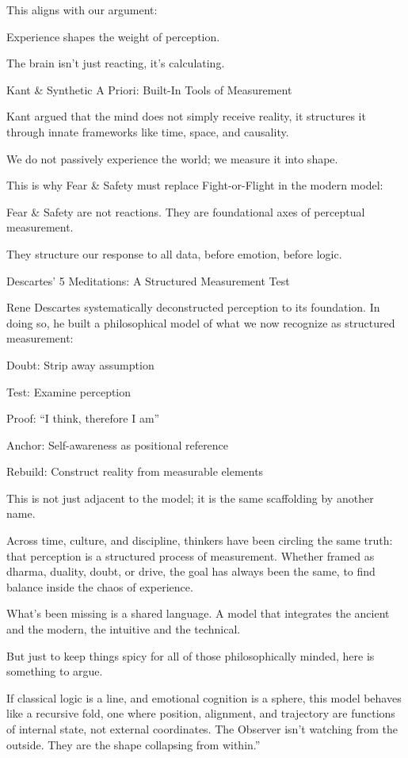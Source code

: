 \documentclass[11pt]{article}
\begin{document}
This aligns with our argument:

Experience shapes the weight of perception.

The brain isn’t just reacting, it’s calculating.

Kant & Synthetic A Priori: Built-In Tools of Measurement

Kant argued that the mind does not simply receive reality, it structures it through innate frameworks like time, space, and causality.

We do not passively experience the world; we measure it into shape.

This is why Fear & Safety must replace Fight-or-Flight in the modern model:

Fear & Safety are not reactions. They are foundational axes of perceptual measurement.

They structure our response to all data, before emotion, before logic.

Descartes’ 5 Meditations: A Structured Measurement Test

Rene Descartes systematically deconstructed perception to its foundation. In doing so, he built a philosophical model of what we now recognize as structured measurement:

Doubt: Strip away assumption

Test: Examine perception

Proof: “I think, therefore I am”

Anchor: Self-awareness as positional reference

Rebuild: Construct reality from measurable elements

This is not just adjacent to the model; it is the same scaffolding by another name.

Across time, culture, and discipline, thinkers have been circling the same truth: that perception is a structured process of measurement. Whether framed as dharma, duality, doubt, or drive, the goal has always been the same, to find balance inside the chaos of experience.

What’s been missing is a shared language. A model that integrates the ancient and the modern, the intuitive and the technical. 

But just to keep things spicy for all of those philosophically minded, here is something to argue.

If classical logic is a line, and emotional cognition is a sphere, this model behaves like a recursive fold, one where position, alignment, and trajectory are functions of internal state, not external coordinates. The Observer isn’t watching from the outside. They are the shape collapsing from within.”
\end{document}
